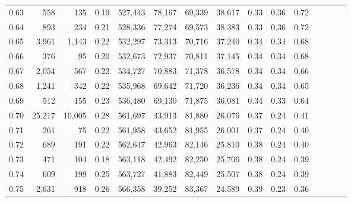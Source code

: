 \begin{tabular}{rrrcrrrrrrrrrrr}
0.63 &     558 &     135 &                                       0.19 &  527,443 &   78,167 &   69,339 &   38,617 &  0.33 &  0.36 &                         0.72 \\
0.64 &     893 &     234 &                                       0.21 &  528,336 &   77,274 &   69,573 &   38,383 &  0.33 &  0.36 &                         0.72 \\
0.65 &   3,961 &   1,143 &                                       0.22 &  532,297 &   73,313 &   70,716 &   37,240 &  0.34 &  0.34 &                         0.68 \\
0.66 &     376 &      95 &                                       0.20 &  532,673 &   72,937 &   70,811 &   37,145 &  0.34 &  0.34 &                         0.68 \\
0.67 &   2,054 &     567 &                                       0.22 &  534,727 &   70,883 &   71,378 &   36,578 &  0.34 &  0.34 &                         0.66 \\
0.68 &   1,241 &     342 &                                       0.22 &  535,968 &   69,642 &   71,720 &   36,236 &  0.34 &  0.34 &                         0.65 \\
0.69 &     512 &     155 &                                       0.23 &  536,480 &   69,130 &   71,875 &   36,081 &  0.34 &  0.33 &                         0.64 \\
0.70 &  25,217 &  10,005 &                                       0.28 &  561,697 &   43,913 &   81,880 &   26,076 &  0.37 &  0.24 &                         0.41 \\
0.71 &     261 &      75 &                                       0.22 &  561,958 &   43,652 &   81,955 &   26,001 &  0.37 &  0.24 &                         0.40 \\
0.72 &     689 &     191 &                                       0.22 &  562,647 &   42,963 &   82,146 &   25,810 &  0.38 &  0.24 &                         0.40 \\
0.73 &     471 &     104 &                                       0.18 &  563,118 &   42,492 &   82,250 &   25,706 &  0.38 &  0.24 &                         0.39 \\
0.74 &     609 &     199 &                                       0.25 &  563,727 &   41,883 &   82,449 &   25,507 &  0.38 &  0.24 &                         0.39 \\
0.75 &   2,631 &     918 &                                       0.26 &  566,358 &   39,252 &   83,367 &   24,589 &  0.39 &  0.23 &                         0.36 \\

\end{tabular}
